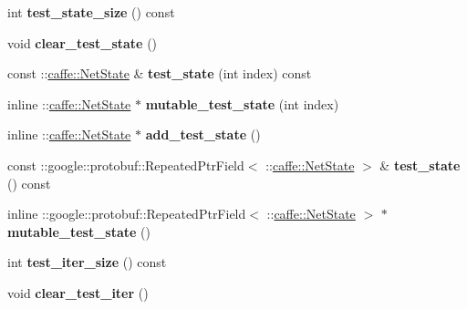 \begin{DoxyCompactItemize}
int {\bfseries test\+\_\+state\+\_\+size} () const
\item 
\mbox{\label{classcaffe_1_1_solver_parameter_aa65a8971ad414f35472844b1a6d6895c}} 
void {\bfseries clear\+\_\+test\+\_\+state} ()
\item 
\mbox{\label{classcaffe_1_1_solver_parameter_afb6645f0ef891355d9a6a1001a2d30cd}} 
const \+::\mbox{\hyperlink{classcaffe_1_1_net_state}{caffe\+::\+Net\+State}} \& {\bfseries test\+\_\+state} (int index) const
\item 
\mbox{\label{classcaffe_1_1_solver_parameter_a5e88d475dcf3a85bc5f83599bf823ab9}} 
inline \+::\mbox{\hyperlink{classcaffe_1_1_net_state}{caffe\+::\+Net\+State}} $\ast$ {\bfseries mutable\+\_\+test\+\_\+state} (int index)
\item 
\mbox{\label{classcaffe_1_1_solver_parameter_adb31eac1f32514c6b1ba01c6736a96eb}} 
inline \+::\mbox{\hyperlink{classcaffe_1_1_net_state}{caffe\+::\+Net\+State}} $\ast$ {\bfseries add\+\_\+test\+\_\+state} ()
\item 
\mbox{\label{classcaffe_1_1_solver_parameter_a0ef3d6f27ec8a3e26cbffa9d41996fa1}} 
const \+::google\+::protobuf\+::\+Repeated\+Ptr\+Field$<$ \+::\mbox{\hyperlink{classcaffe_1_1_net_state}{caffe\+::\+Net\+State}} $>$ \& {\bfseries test\+\_\+state} () const
\item 
\mbox{\label{classcaffe_1_1_solver_parameter_ae8a3f8c87014f24d19f87bd66a64f45b}} 
inline \+::google\+::protobuf\+::\+Repeated\+Ptr\+Field$<$ \+::\mbox{\hyperlink{classcaffe_1_1_net_state}{caffe\+::\+Net\+State}} $>$ $\ast$ {\bfseries mutable\+\_\+test\+\_\+state} ()
\item 
\mbox{\label{classcaffe_1_1_solver_parameter_a12a5e73ff92fc5037d23e0f91d20a3a0}} 
int {\bfseries test\+\_\+iter\+\_\+size} () const
\item 
\mbox{\label{classcaffe_1_1_solver_parameter_a55d1481c6fd383ea3d19fb10d8e61fe7}} 
void {\bfseries clear\+\_\+test\+\_\+iter} ()

\end{DoxyCompactItemize}
